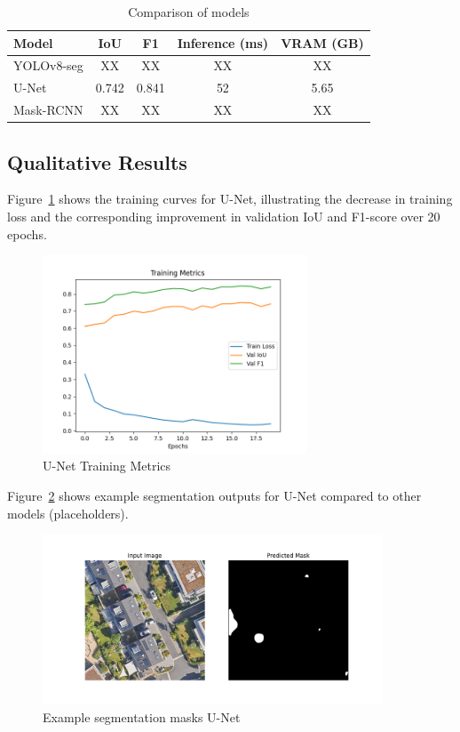 \documentclass[rnd]{mas_proposal}
\begin{document}
\begin{table}[h]
\centering
\begin{tabular}{lcccc}
\hline
\textbf{Model} & \textbf{IoU} & \textbf{F1} & \textbf{Inference (ms)} & \textbf{VRAM (GB)} \\
\hline
YOLOv8-seg & XX & XX & XX & XX \\
U-Net & 0.742 & 0.841 & 52 & 5.65 \\
Mask-RCNN & XX & XX & XX & XX \\
\hline
\end{tabular}
\caption{Comparison of models}
\label{tab:results}
\end{table}


\subsection{Qualitative Results}
Figure~\ref{fig:training_metrics} shows the training curves for U-Net, illustrating the decrease in training loss 
and the corresponding improvement in validation IoU and F1-score over 20 epochs.  

\begin{figure}[h]
\centering
\includegraphics[width=0.7\textwidth]{images/training_metrics.png}
\caption{U-Net Training Metrics}
\label{fig:training_metrics}
\end{figure}

Figure~\ref{fig:segmentation} shows example segmentation outputs for U-Net compared to other models (placeholders).  

\begin{figure}[h]
\centering
\includegraphics[width=0.9\textwidth]{images/inference_unet.png}
\caption{Example segmentation masks U-Net}
\label{fig:segmentation}
\end{figure}
\end{document}
